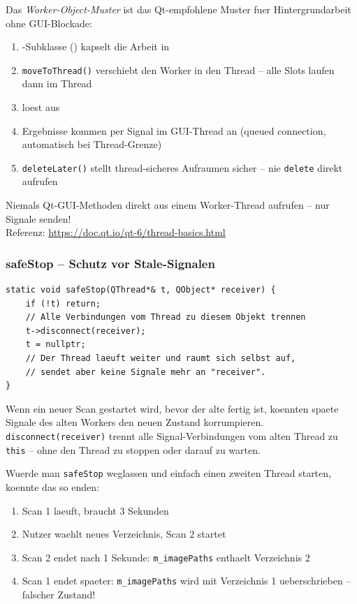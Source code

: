 \begin{qtinfo}[title={Qt-Hintergrund: Worker-Object-Muster}]
Das \emph{Worker-Object-Muster} ist das Qt-empfohlene
Muster fuer Hintergrundarbeit ohne GUI-Blockade:
\begin{enumerate}[noitemsep]
  \item {}-Subklasse ()
    kapselt die Arbeit in 
  \item \verb|moveToThread()| verschiebt den Worker
    in den Thread -- alle Slots laufen dann im Thread
  \item {} loest
     aus
  \item Ergebnisse kommen per Signal im GUI-Thread an
    (queued connection, automatisch bei Thread-Grenze)
  \item \verb|deleteLater()| stellt thread-sicheres
    Aufraumen sicher -- nie \verb|delete| direkt aufrufen
\end{enumerate}
Niemals Qt-GUI-Methoden direkt aus einem Worker-Thread
aufrufen -- nur Signale senden!\\
Referenz: \url{https://doc.qt.io/qt-6/thread-basics.html}
\end{qtinfo}

\subsubsection{safeStop -- Schutz vor Stale-Signalen}

\begin{lstlisting}[caption={safeStop: verhindert Signale in ungueltige Slots}]
static void safeStop(QThread*& t, QObject* receiver) {
    if (!t) return;
    // Alle Verbindungen vom Thread zu diesem Objekt trennen
    t->disconnect(receiver);
    t = nullptr;
    // Der Thread laeuft weiter und raumt sich selbst auf,
    // sendet aber keine Signale mehr an "receiver".
}
\end{lstlisting}

Wenn ein neuer Scan gestartet wird, bevor der alte fertig ist,
koennten spaete Signale des alten Workers den neuen Zustand
korrumpieren. \verb|disconnect(receiver)| trennt alle
Signal-Verbindungen vom alten Thread zu \verb|this| --
ohne den Thread zu stoppen oder darauf zu warten.

\begin{warnung}[title={Achtung: Stale-Signal-Bug}]
Wuerde man \verb|safeStop| weglassen und einfach einen
zweiten Thread starten, koennte das so enden:
\begin{enumerate}[noitemsep]
  \item Scan 1 laeuft, braucht 3 Sekunden
  \item Nutzer waehlt neues Verzeichnis, Scan 2 startet
  \item Scan 2 endet nach 1 Sekunde: \verb|m_imagePaths|
    enthaelt Verzeichnis 2
  \item Scan 1 endet spaeter: \verb|m_imagePaths| wird
    mit Verzeichnis 1 ueberschrieben -- falscher Zustand!
\end{enumerate}
\end{warnung}

